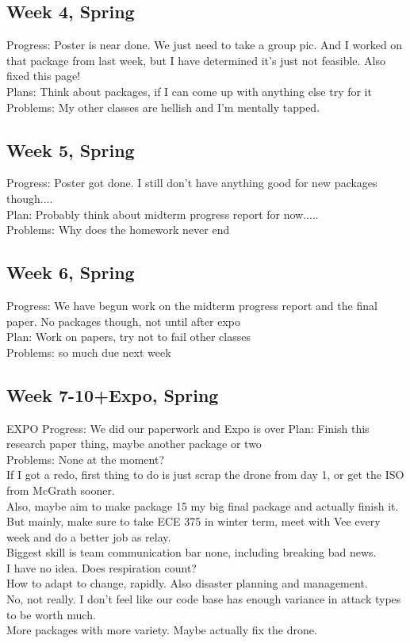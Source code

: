 \documentclass[IEEEtran,letterpaper,10pt,notitlepage,draftclsnofoot,onecolumn]{article}
\begin{document}
\begin{sloppypar}
\subsection{Week 4, Spring}
Progress: Poster is near done. We just need to take a group pic. And I 
worked on that package from last week, but I have determined it's just not 
feasible. Also fixed this page!\\
Plans: Think about packages, if I can come up with anything else try for it\\
Problems: My other classes are hellish and I'm mentally tapped.  \\
\subsection{Week 5, Spring}
Progress: Poster got done. I still don't have anything good for new packages 
though....\\
Plan: Probably think about midterm progress report for now.....\\
Problems: Why does the homework never end\\
\subsection{Week 6, Spring}
Progress: We have begun work on the midterm progress report and the final
paper. No packages though, not until after expo\\
Plan: Work on papers, try not to fail other classes\\
Problems: so much due next week\\
\subsection{Week 7-10+Expo, Spring}
EXPO
Progress: We did our paperwork and Expo is over  
Plan: Finish this research paper thing, maybe another package or two  \\
Problems: None at the moment?  \\
If I got a redo, first thing to do is just scrap the drone from day 1, or 
get the ISO from McGrath sooner. \\ 
Also, maybe aim to make package 15 my big final package and actually finish 
it. But mainly, make sure to take ECE 375 in winter term, meet with Vee 
every week and do a better job as relay. \\
Biggest skill is team communication bar none, including breaking bad news.  \\
I have no idea. Does respiration count?  \\
How to adapt to change, rapidly. Also disaster planning and management.  \\
No, not really. I don't feel like our code base has enough variance in attack 
types to be worth much.  \\
More packages with more variety. Maybe actually fix the drone. \\
\newpage

\end{sloppypar}
\end{document}
